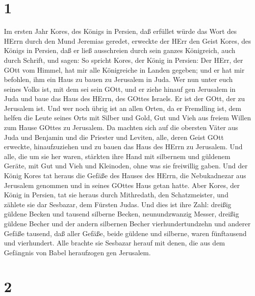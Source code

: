 \hypertarget{section}{%
\section{1}\label{section}}

 Im ersten Jahr Kores, des Königs in Persien, daß erfüllet
würde das Wort des HErrn durch den Mund Jeremias geredet, erweckte der
HErr den Geist Kores, des Königs in Persien, daß er ließ ausschreien
durch sein ganzes Königreich, auch durch Schrift, und sagen:
 So spricht Kores, der König in Persien: Der HErr, der GOtt
vom Himmel, hat mir alle Königreiche in Landen gegeben; und er hat mir
befohlen, ihm ein Haus zu bauen zu Jerusalem in Juda.  Wer
nun unter euch seines Volks ist, mit dem sei sein GOtt, und er ziehe
hinauf gen Jerusalem in Juda und baue das Haus des HErrn, des GOttes
Israels. Er ist der GOtt, der zu Jerusalem ist.  Und wer
noch übrig ist an allen Orten, da er Fremdling ist, dem helfen die Leute
seines Orts mit Silber und Gold, Gut und Vieh aus freiem Willen zum
Hause GOttes zu Jerusalem.  Da machten sich auf die obersten
Väter aus Juda und Benjamin und die Priester und Leviten, alle, deren
Geist GOtt erweckte, hinaufzuziehen und zu bauen das Haus des HErrn zu
Jerusalem.  Und alle, die um sie her waren, stärkten ihre
Hand mit silbernem und güldenem Geräte, mit Gut und Vieh und Kleinoden,
ohne was sie freiwillig gaben.  Und der König Kores tat
heraus die Gefäße des Hauses des HErrn, die Nebukadnezar aus Jerusalem
genommen und in seines GOttes Haus getan hatte.  Aber Kores,
der König in Persien, tat sie heraus durch Mithredath, den
Schatzmeister, und zählete sie dar Sesbazar, dem Fürsten Judas.
 Und dies ist ihre Zahl: dreißig güldene Becken und tausend
silberne Becken, neunundzwanzig Messer,  dreißig güldene
Becher und der andern silbernen Becher vierhundertundzehn und anderer
Gefäße tausend,  daß aller Gefäße, beide güldene und
silberne, waren fünftausend und vierhundert. Alle brachte sie Sesbazar
herauf mit denen, die aus dem Gefängnis von Babel heraufzogen gen
Jerusalem.

\hypertarget{section-1}{%
\section{2}\label{section-1}}

